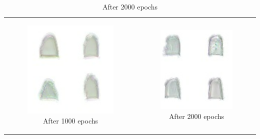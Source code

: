\documentclass[conference]{IEEEtran}
\begin{document}
\begin{table}[ht]
\begin{tabular}{cc}
\newline
\begin{subfigure}{0.23\textwidth}\centering\includegraphics[width=1\columnwidth]{resources/gen_fmnist/ex1000_adv.png}\caption{After 1000 epochs}\label{fig:tabc}\end{subfigure}&
\begin{subfigure}{0.23\textwidth}\centering\includegraphics[width=1\columnwidth]{resources/gen_fmnist/ex2000_adv.png}\caption{After 2000 epochs}\label{fig:taba2}\end{subfigure}\\

\end{tabular}
\end{table}
\end{document}
